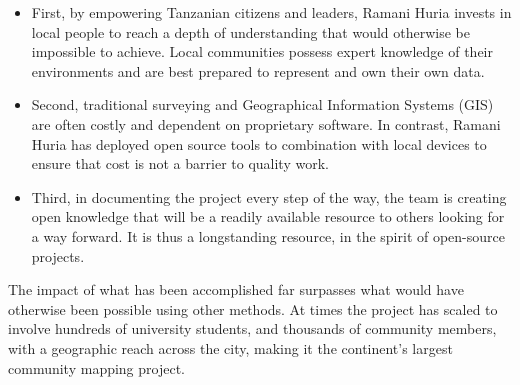 \documentclass[a4paper,12pt,twoside]{article}
\begin{document}

\begin{mdframed}[hidealllines=true,backgroundcolor=RHgreen!10,innerleftmargin=6pt,innerrightmargin=6pt,leftmargin=-3pt,rightmargin=-3pt]
\begin{itemize}
    \item First, by empowering Tanzanian citizens and leaders, Ramani Huria invests in local people to reach a depth of understanding that would otherwise be impossible to achieve. Local communities possess expert knowledge of their environments and are best prepared to represent and own their own data. 
    \item Second, traditional surveying and Geographical Information Systems (GIS) are often costly and dependent on proprietary software. In contrast, Ramani Huria has deployed open source tools to combination with local devices to ensure that cost is not a barrier to quality work.  
    \item Third, in documenting the project every step of the way, the team is creating open knowledge that will be a readily available resource to others looking for a way forward. It is thus a longstanding resource, in the spirit of open-source projects. 
\end{itemize}
\end{mdframed}

\begin{multicols}{2}

The impact of what has been accomplished far surpasses what would have otherwise been possible using other methods. At times the project has scaled to involve hundreds of university students, and thousands of community members, with a geographic reach across the city, making it the continent's largest community mapping project.
\end{multicols}


\end{document}
\end{multicols}
\end{document}
